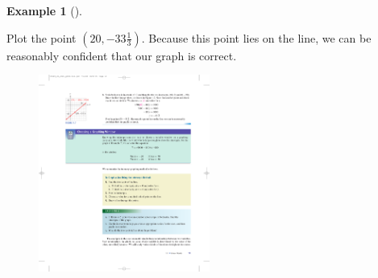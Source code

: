 \documentclass[10pt,]{book}
\theoremstyle{plain}
\theoremstyle{definition}
\theoremstyle{definition}
\theoremstyle{definition}
\newtheorem{example}[theorem]{Example}
\theoremstyle{definition}
\theoremstyle{definition}
\numberwithin{equation}{section}
\begin{document}
\begin{example}[]
\begin{enumerate}[label=*\alph**]
            Plot the point \((20, −33\frac{1}{3})\). Because this point lies on the line, we can be reasonably confident that our graph is correct. 
            \leavevmode%
\begin{figure}
\centering
\includegraphics[width=0.50\textwidth,]{images/fig-example-graph-intercepts.pdf}\caption{\label{fig-example-graph-intercepts}}
\end{figure}

\end{enumerate}
\end{example}
\end{document}
